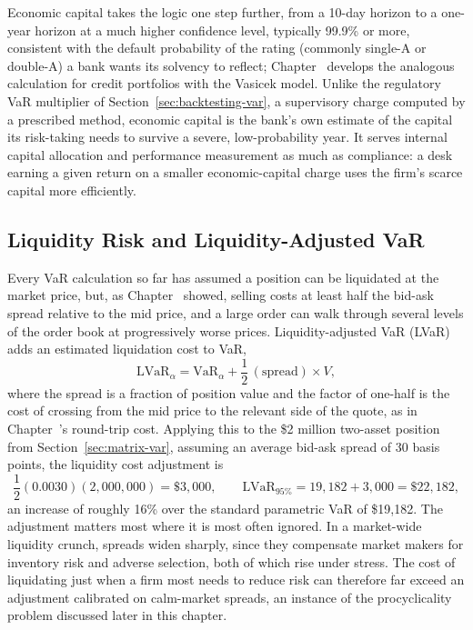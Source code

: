 \documentclass[../ai_in_finance]{subfiles}
\begin{document}
Economic capital takes the logic one step further, from a 10-day horizon to a one-year horizon at a much higher confidence level, typically 99.9\% or more, consistent with the default probability of the rating (commonly single-A or double-A) a bank wants its solvency to reflect; Chapter~ develops the analogous calculation for credit portfolios with the Vasicek model.
Unlike the regulatory VaR multiplier of Section~\ref{sec:backtesting-var}, a supervisory charge computed by a prescribed method, economic capital is the bank's own estimate of the capital its risk-taking needs to survive a severe, low-probability year. It serves internal capital allocation and performance measurement as much as compliance: a desk earning a given return on a smaller economic-capital charge uses the firm's scarce capital more efficiently.

\subsection{Liquidity Risk and Liquidity-Adjusted VaR}
\label{sec:liquidity-lvar}

Every VaR calculation so far has assumed a position can be liquidated at the market price, but, as Chapter~ showed, selling costs at least half the bid-ask spread relative to the mid price, and a large order can walk through several levels of the order book at progressively worse prices. Liquidity-adjusted VaR (LVaR) adds an estimated liquidation cost to VaR,
\begin{equation*}
\text{LVaR}_\alpha = \text{VaR}_\alpha + \frac{1}{2}\,(\text{spread}) \times V,
\end{equation*}
where the spread is a fraction of position value and the factor of one-half is the cost of crossing from the mid price to the relevant side of the quote, as in Chapter~'s round-trip cost. Applying this to the \$2 million two-asset position from Section~\ref{sec:matrix-var}, assuming an average bid-ask spread of 30 basis points, the liquidity cost adjustment is
\begin{equation*}
\frac{1}{2}(0.0030)(2{,}000{,}000) = \$3{,}000, \qquad \text{LVaR}_{95\%} = 19{,}182 + 3{,}000 = \$22{,}182,
\end{equation*}
an increase of roughly 16\% over the standard parametric VaR of \$19,182.
The adjustment matters most where it is most often ignored. In a market-wide liquidity crunch, spreads widen sharply, since they compensate market makers for inventory risk and adverse selection, both of which rise under stress. The cost of liquidating just when a firm most needs to reduce risk can therefore far exceed an adjustment calibrated on calm-market spreads, an instance of the procyclicality problem discussed later in this chapter.
\end{document}

